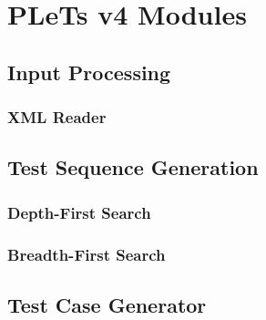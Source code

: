 \chapter{PLeTs v4 Modules}
\label{ch:modules}



\section{Input Processing}



\subsection{XML Reader}


\section{Test Sequence Generation}



\subsection{Depth-First Search}


\subsection{Breadth-First Search}


\section{Test Case Generator}


